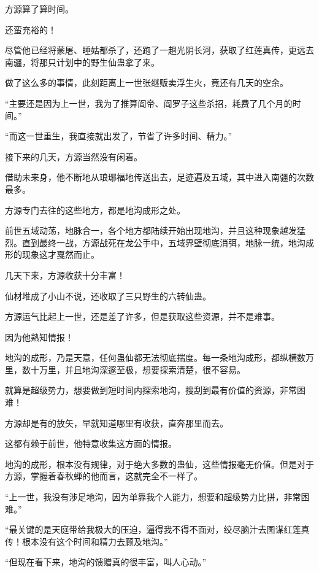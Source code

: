 
\begin{this_body}

方源算了算时间。

还蛮充裕的！

尽管他已经将蒙屠、睡姑都杀了，还跑了一趟光阴长河，获取了红莲真传，更远去南疆，将那只计划中的野生仙蛊拿了来。

做了这么多的事情，此刻距离上一世张继贩卖浮生火，竟还有几天的空余。

“主要还是因为上一世，我为了推算阎帝、阎罗子这些杀招，耗费了几个月的时间。”

“而这一世重生，我直接就出发了，节省了许多时间、精力。”

接下来的几天，方源当然没有闲着。

借助未来身，他不断地从琅琊福地传送出去，足迹遍及五域，其中进入南疆的次数最多。

方源专门去往的这些地方，都是地沟成形之处。

前世五域动荡，地脉合一，各个地方都陆续开始出现地沟，并且这种现象越发猛烈。直到最终一战，方源战死在龙公手中，五域界壁彻底消弭，地脉一统，地沟成形的现象这才戛然而止。

几天下来，方源收获十分丰富！

仙材堆成了小山不说，还收取了三只野生的六转仙蛊。

方源运气比起上一世，还是差了许多，但是获取这些资源，并不是难事。

因为他熟知情报！

地沟的成形，乃是天意，任何蛊仙都无法彻底揣度。每一条地沟成形，都纵横数万里，数十万里，并且地沟深邃至极，想要探索清楚，很不容易。

就算是超级势力，想要做到短时间内探索地沟，搜刮到最有价值的资源，非常困难！

方源却是有的放矢，早就知道哪里有收获，直奔那里而去。

这都有赖于前世，他特意收集这方面的情报。

地沟的成形，根本没有规律，对于绝大多数的蛊仙，这些情报毫无价值。但是对于方源，掌握着春秋蝉的他而言，这就完全不一样了。

“上一世，我没有涉足地沟，因为单靠我个人能力，想要和超级势力比拼，非常困难。”

“最关键的是天庭带给我极大的压迫，逼得我不得不面对，绞尽脑汁去图谋红莲真传！根本没有这个时间和精力去顾及地沟。”

“但现在看下来，地沟的馈赠真的很丰富，叫人心动。”


\end{this_body}
